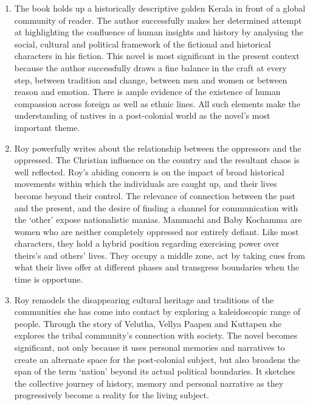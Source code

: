 \begin{enumerate}
  \item The book holds up a historically descriptive golden Kerala in front of a global community of reader.  The author successfully makes her determined attempt at highlighting the confluence of human insights and history by analysing the social, cultural and political framework of the fictional and historical characters in his fiction.  This novel is most significant in the present context because the author successfully draws a fine balance in the craft at every step, between tradition and change, between men and women or between reason and emotion.  There is ample evidence of the existence of human compassion across foreign as well as ethnic lines.  All such elements make the understanding of natives in a post-colonial world as the novel’s most important theme.

  \item Roy powerfully writes about the relationship between the oppressors and the oppressed.  The Christian influence on the country and the resultant chaos is well reflected. Roy’s abiding concern is on the impact of broad historical movements within which the individuals are caught up, and their lives become beyond their control. The relevance of connection between the past and the present, and the desire of finding a channel for communication with the ‘other’ expose nationalistic manias. Mammachi and Baby Kochamma are women who are neither completely oppressed nor entirely defiant. Like most characters, they hold a hybrid position regarding exercising power over theirs’s and others’ lives. They occupy a middle zone, act by taking cues from what their lives offer at different phases and transgress boundaries when the time is opportune.

  \item Roy remodels the disappearing cultural heritage and traditions of the communities she has come into contact by exploring a kaleidoscopic range of people.  Through the story of Velutha, Vellya Paapen and Kuttapen she explores the tribal community’s connection with society.  The novel becomes significant, not only because it uses personal memories and narratives to create an alternate space for the post-colonial subject, but also broadens the span of the term `nation' beyond its actual political boundaries.  It sketches the collective journey of history, memory and personal narrative as they progressively become a reality for the living subject.


\end{enumerate}
